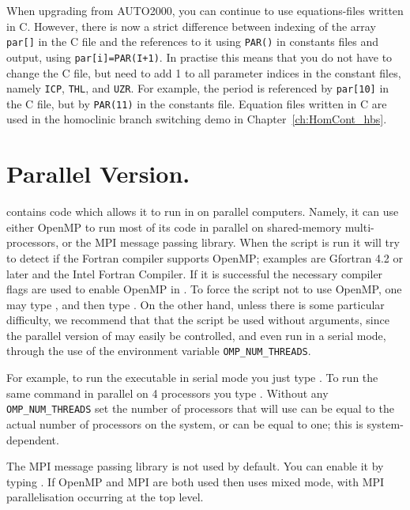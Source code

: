 \documentclass[12pt]{report}
\begin{document}
When upgrading from {\cal AUTO2000}, you can continue to use
equations-files written in C. However, there is now a strict
difference between indexing of the array {\tt par[]} in the
C file and the references to it using {\tt PAR()} in constants
files and output, using {\tt par[i]=PAR(I+1)}. In practise this
means that you do not have to change the C file, but need to
add 1 to all parameter indices in the constant files, namely
{\tt ICP}, {\tt THL}, and {\tt UZR}. For example,
the period is referenced by {\tt par[10]} in the C file,
but by {\tt PAR(11)} in the constants file. Equation files
written in C are used in the homoclinic branch switching
demo in Chapter~\ref{ch:HomCont_hbs}.
 
\section{ Parallel Version.} \label{sec:Parallel}
\AUTO contains code which allows
it to run in on parallel computers.  Namely,
it can use either OpenMP to run most of its code in parallel
on shared-memory multi-processors, or the MPI message passing
library.
When the  script is run it will try to
detect if the Fortran compiler supports OpenMP; examples
are Gfortran 4.2 or later and the Intel Fortran Compiler.
If it is successful the necessary compiler flags are used
to enable OpenMP in \AUTO.
To force the  script not to use OpenMP,
one may type ,
and then type .
On the other hand, unless there is some
particular difficulty, we recommend that that the 
 script be used without arguments, since the
parallel version of \AUTO may easily be controlled,
and even run in a serial mode,  
through the use of the environment variable {\tt OMP\_NUM\_THREADS}.

For example, to run the \AUTO executable 
in serial mode you just type .
To run the same command in parallel on 4 processors you type 
. Without any {\tt OMP\_NUM\_THREADS}
set the number of processors that \AUTO will use can be equal to the
actual number of processors on the system, or can be equal to one;
this is system-dependent.

The MPI message passing library is not used by default. You can enable it
by typing  . If OpenMP and MPI are
both used then \AUTO uses mixed mode, with MPI parallelisation
occurring at the top level.
\end{document}
